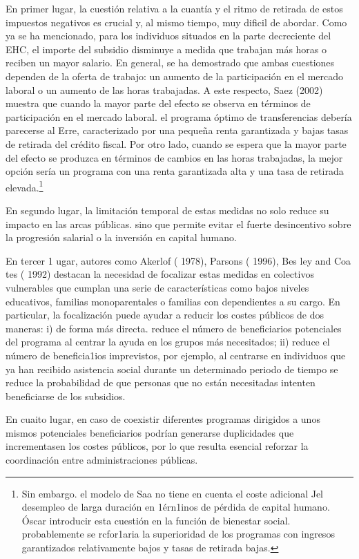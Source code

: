 \documentclass[10pt,a4paper]{article}
\begin{document}
En primer lugar, la cuestión relativa a la cuantía y el ritmo de retirada de estos impuestos negativos es crucial y, al mismo tiempo, muy dificil de abordar. Como ya se ha mencionado, para los individuos situados en la parte decreciente del EHC, el importe del subsidio disminuye a medida que trabajan más horas o reciben un mayor salario. En general, se ha demostrado que ambas cuestiones dependen de la oferta de trabajo: un aumento de la participación en el mercado laboral o un aumento de las horas trabajadas. A este respecto, Saez (2002) muestra que cuando la mayor parte del efecto se observa en términos de participación en el mercado laboral. el programa óptimo de transferencias debería parecerse al Erre, caracterizado por una pequeña renta garantizada y bajas tasas de retirada del crédito fiscal. Por otro lado, cuando se espera que la mayor parte del efecto se produzca en términos de cambios en las horas trabajadas, la mejor opción sería un programa con una renta garantizada alta y una tasa de retirada elevada.\footnote{%
    Sin embargo. el modelo de Saa no tiene en cuenta el coste adicional Jel desempleo de larga duración en 1érn1inos de pérdida de capital humano. Óscar introducir esta cuestión en la función de bienestar social. probablemente se rcfor1aria la superioridad de los programas con ingresos garantizados relativamente bajos y tasas de retirada bajas.
} 

En segundo lugar, la limitación temporal de estas medidas no solo reduce su impacto en las arcas públicas. sino que permite evitar el fuerte desincentivo sobre la progresión salarial o la inversión en capital humano.

En tercer 1 ugar, autores como Akerlof ( 1978), Parsons ( 1996), Bes ley and Coa tes ( 1992) destacan la necesidad de focalizar estas medidas en colectivos vulnerables que cumplan una serie de características como bajos niveles educativos, familias monoparentales o familias con dependientes a su cargo. En particular, la focalización puede ayudar a reducir los costes públicos de dos maneras: i) de forma más directa. reduce el número de beneficiarios potenciales del programa al centrar la ayuda en los grupos más necesitados; ii) reduce el número de beneficia1ios imprevistos, por ejemplo, al centrarse en individuos que ya han recibido asistencia social durante un determinado periodo de tiempo se reduce la probabilidad de que personas que no están necesitadas intenten beneficiarse de los subsidios.

En cuaito lugar, en caso de coexistir diferentes programas dirigidos a unos mismos potenciales beneficiarios podrían generarse duplicidades que incrementasen los costes públicos, por lo que resulta esencial reforzar la coordinación entre administraciones públicas.
\end{document}
